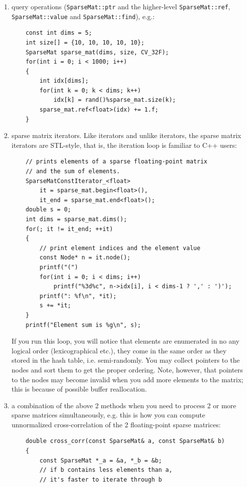 \begin{enumerate}
    \item query operations (\texttt{SparseMat::ptr} and the higher-level \texttt{SparseMat::ref}, \texttt{SparseMat::value} and \texttt{SparseMat::find}), e.g.:
    \begin{lstlisting}
    const int dims = 5;
    int size[] = {10, 10, 10, 10, 10};
    SparseMat sparse_mat(dims, size, CV_32F);
    for(int i = 0; i < 1000; i++)
    {
        int idx[dims];
        for(int k = 0; k < dims; k++)
            idx[k] = rand()%sparse_mat.size(k);
        sparse_mat.ref<float>(idx) += 1.f;
    }
    \end{lstlisting}
    \item sparse matrix iterators. Like  iterators and unlike  iterators, the sparse matrix iterators are STL-style, that is, the iteration loop is familiar to C++ users:
    \begin{lstlisting}
    // prints elements of a sparse floating-point matrix
    // and the sum of elements.
    SparseMatConstIterator_<float>
        it = sparse_mat.begin<float>(),
        it_end = sparse_mat.end<float>();
    double s = 0;
    int dims = sparse_mat.dims();
    for(; it != it_end; ++it)
    {
        // print element indices and the element value
        const Node* n = it.node();
        printf("(")
        for(int i = 0; i < dims; i++)
            printf("%3d%c", n->idx[i], i < dims-1 ? ',' : ')');
        printf(": %f\n", *it);    
        s += *it;
    }
    printf("Element sum is %g\n", s);
    \end{lstlisting}
    If you run this loop, you will notice that elements are enumerated in no any logical order (lexicographical etc.), they come in the same order as they stored in the hash table, i.e. semi-randomly. You may collect pointers to the nodes and sort them to get the proper ordering. Note, however, that pointers to the nodes may become invalid when you add more elements to the matrix; this is because of possible buffer reallocation.
    \item a combination of the above 2 methods when you need to process 2 or more sparse matrices simultaneously, e.g. this is how you can compute unnormalized cross-correlation of the 2 floating-point sparse matrices:
    \begin{lstlisting}
    double cross_corr(const SparseMat& a, const SparseMat& b)
    {
        const SparseMat *_a = &a, *_b = &b;
        // if b contains less elements than a,
        // it's faster to iterate through b

\end{lstlisting}
\end{enumerate}
